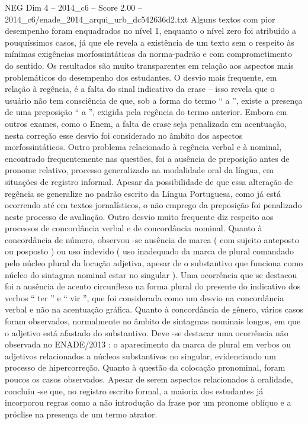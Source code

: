 \begin{textsample}{NEG Dim 4 – 2014\_c6 – Score 2.00 – 2014\_c6/enade\_2014\_arqui\_urb\_dc542636d2.txt}
Alguns textos com pior desempenho foram enquadrados no nível 1, enquanto o nível zero foi atribuído a pouquíssimos casos, já que ele revela a existência de um texto sem o respeito às mínimas exigências morfossintáticas da norma-padrão e com comprometimento do sentido.
Os resultados são muito transparentes em relação aos aspectos mais problemáticos do desempenho dos estudantes.
O desvio mais frequente, em relação à regência, é a falta do sinal indicativo da crase – isso revela que o usuário não tem consciência de que, sob a forma do termo “ a ”, existe a presença de uma preposição “ a ”, exigida pela regência do termo anterior.
Embora em outros exames, como o Enem, a falta de crase seja penalizada em acentuação, nesta correção esse desvio foi considerado no âmbito dos aspectos morfossintáticos.
Outro problema relacionado à regência verbal e à nominal, encontrado frequentemente nas questões, foi a ausência de preposição antes de pronome relativo, processo generalizado na modalidade oral da língua, em situações de registro informal.
Apesar da possibilidade de que essa alteração de regência se generalize no padrão escrito da Língua Portuguesa, como já está ocorrendo até em textos jornalísticos, o não emprego da preposição foi penalizado neste processo de avaliação.
Outro desvio muito frequente diz respeito aos processos de concordância verbal e de concordância nominal.
Quanto à concordância de número, observou -se ausência de marca ( com sujeito anteposto ou posposto ) ou uso indevido ( uso inadequado da marca de plural comandado pelo núcleo plural da locução adjetiva, apesar de o substantivo que funciona como núcleo do sintagma nominal estar no singular ).
Uma ocorrência que se destacou foi a ausência de acento circunflexo na forma plural do presente do indicativo dos verbos “ ter ” e “ vir ”, que foi considerada como um desvio na concordância verbal e não na acentuação gráfica.
Quanto à concordância de gênero, vários casos foram observados, normalmente no âmbito de sintagmas nominais longos, em que o adjetivo está afastado do substantivo.
Deve -se destacar uma ocorrência não observada no ENADE/2013 : o aparecimento da marca de plural em verbos ou adjetivos relacionados a núcleos substantivos no singular, evidenciando um processo de hipercorreção.
Quanto à questão da colocação pronominal, foram poucos os casos observados.
Apesar de serem aspectos relacionados à oralidade, concluiu -se que, no registro escrito formal, a maioria dos estudantes já incorporou regras como a não introdução da frase por um pronome oblíquo e a próclise na presença de um termo atrator.

\end{textsample}
